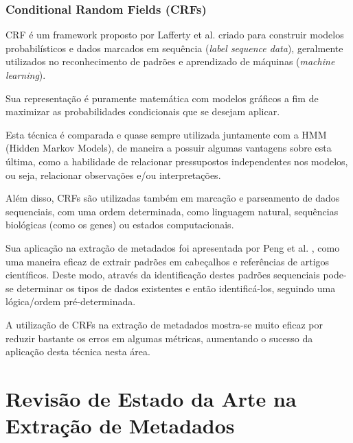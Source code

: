 \subsubsection{Conditional Random Fields (CRFs)}


CRF é um framework proposto por Lafferty et al. \cite{Lafferty-CRF} criado para construir modelos probabilísticos e dados marcados em sequência (\textit{label sequence data}), geralmente utilizados no reconhecimento de padrões e aprendizado de máquinas (\textit{machine learning}).

Sua representação é puramente matemática com modelos gráficos a fim de maximizar as probabilidades condicionais que se desejam aplicar.

Esta técnica é comparada e quase sempre utilizada juntamente com a HMM (Hidden Markov Models), de maneira a possuir algumas vantagens sobre esta última, como a habilidade de relacionar pressupostos independentes nos modelos, ou seja, relacionar observações e/ou interpretações.

Além disso, CRFs são utilizadas também em marcação e parseamento de dados sequenciais, com uma ordem determinada, como linguagem natural, sequências biológicas (como os genes) ou estados computacionais.


Sua aplicação na extração de metadados foi apresentada por Peng et al. \cite{Peng-CRF-IE}, como uma maneira eficaz de extrair padrões em cabeçalhos e referências de artigos científicos. Deste modo, através da identificação destes padrões sequenciais pode-se determinar os tipos de dados existentes e então identificá-los, seguindo uma lógica/ordem pré-determinada.

A utilização de CRFs na extração de metadados mostra-se muito eficaz por reduzir bastante os erros em algumas métricas, aumentando o sucesso da aplicação desta técnica nesta área.













\section{Revisão de Estado da Arte na Extração de Metadados}


